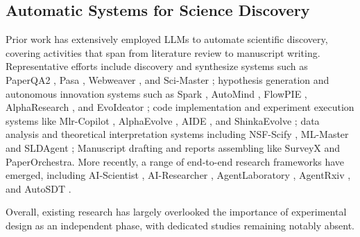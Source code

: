 \documentclass[letterpaper]{article} %
\begin{document}
\subsection{Automatic Systems for Science Discovery}
Prior work has extensively employed LLMs to automate scientific discovery, covering activities that span from literature review to manuscript writing. 
Representative efforts include discovery and synthesize systems such as PaperQA2 \cite{skarlinski2024language}, Pasa \cite{he2025pasa}, Webweaver \cite{li2025webweaver}, 
and Sci-Master \cite{chai2025scimaster}; hypothesis generation and autonomous innovation systems such as Spark \cite{sanyal2025spark}, AutoMind \cite{ou2025automind}, 
FlowPIE \cite{wang2026flowpie}, AlphaResearch \cite{yu2025alpharesearch}, and EvoIdeator \cite{sauter2026evoideator}; code implementation and experiment execution systems 
like Mlr-Copilot \cite{li2024mlr}, AlphaEvolve \cite{novikov2025alphaevolve}, AIDE \cite{jiang2025aide}, and ShinkaEvolve \cite{lange2025shinkaevolve}; data analysis and 
theoretical interpretation systems including NSF-Scify \cite{rao2025nsf}, ML-Master \cite{liu2025ml} and SLDAgent \cite{lin2025can}; Manuscript drafting and reports assembling like SurveyX \cite{liang2025surveyx} and PaperOrchestra\cite{song2026paperorchestra}. 
More recently, a range of end-to-end research frameworks have emerged, including AI-Scientist \cite{lu2024ai,yamada2025ai}, 
AI-Researcher \cite{tang2026ai}, AgentLaboratory \cite{schmidgall2025agent}, AgentRxiv \cite{schmidgall2025agentrxiv}, 
and AutoSDT \cite{li2025autosdt}.

Overall, existing research has largely overlooked the importance of experimental design as an independent phase, 
with dedicated studies remaining notably absent.%
\end{document}
